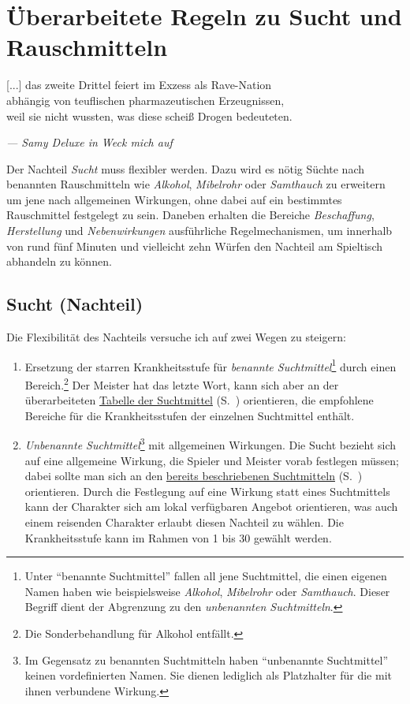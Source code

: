 \chapter{Überarbeitete Regeln zu Sucht und Rauschmitteln}
\epigraph{[...] das zweite Drittel feiert im Exzess als Rave-Nation \\
abhängig von teuflischen pharmazeutischen Erzeugnissen, \\
weil sie nicht wussten, was diese scheiß Drogen bedeuteten.}{\emph{--- Samy Deluxe in \emph{Weck mich auf}}}
\noindent Der Nachteil \emph{Sucht} muss flexibler werden. Dazu wird es nötig Süchte nach benannten Rauschmitteln wie \emph{Alkohol}, \emph{Mibelrohr} oder \emph{Samthauch} zu erweitern um jene nach allgemeinen Wirkungen, ohne dabei auf ein bestimmtes Rauschmittel festgelegt zu sein. Daneben erhalten die Bereiche \emph{Beschaffung}, \emph{Herstellung} und \emph{Nebenwirkungen} ausführliche Regelmechanismen, um innerhalb von rund fünf Minuten und vielleicht zehn Würfen den Nachteil am Spieltisch abhandeln zu können.

\section{Sucht (Nachteil)}
Die Flexibilität des Nachteils versuche ich auf zwei Wegen zu steigern:
\begin{enumerate}
	\item Ersetzung der starren Krankheitsstufe für \emph{benannte Suchtmittel}\footnote{Unter \enquote{benannte Suchtmittel} fallen all jene Suchtmittel, die einen eigenen Namen haben wie beispielsweise \emph{Alkohol}, \emph{Mibelrohr} oder \emph{Samthauch}. Dieser Begriff dient der Abgrenzung zu den \emph{unbenannten Suchtmitteln}.} durch einen Bereich.\footnote{Die Sonderbehandlung für Alkohol entfällt.} Der Meister hat das letzte Wort, kann sich aber an der überarbeiteten \hyperref[tbl-suchtmittel-revised]{Tabelle der Suchtmittel} (S.~\pageref{tbl-suchtmittel-revised}) orientieren, die empfohlene Bereiche für die Krankheitsstufen der einzelnen Suchtmittel enthält.
	\item \emph{Unbenannte Suchtmittel}\footnote{Im Gegensatz zu benannten Suchtmitteln haben \enquote{unbenannte Suchtmittel} keinen vordefinierten Namen. Sie dienen lediglich als Platzhalter für die mit ihnen verbundene Wirkung.} mit allgemeinen Wirkungen. Die Sucht bezieht sich auf eine allgemeine Wirkung, die Spieler und Meister vorab festlegen müssen; dabei sollte man sich an den \hyperref[tbl-suchtmittel]{bereits beschriebenen Suchtmitteln} (S.~\pageref{tbl-suchtmittel}) orientieren. Durch die Festlegung auf eine Wirkung statt eines Suchtmittels kann der Charakter sich am lokal verfügbaren Angebot orientieren, was auch einem reisenden Charakter erlaubt diesen Nachteil zu wählen. Die Krankheitsstufe kann im Rahmen von 1 bis 30 gewählt werden.
\end{enumerate}

